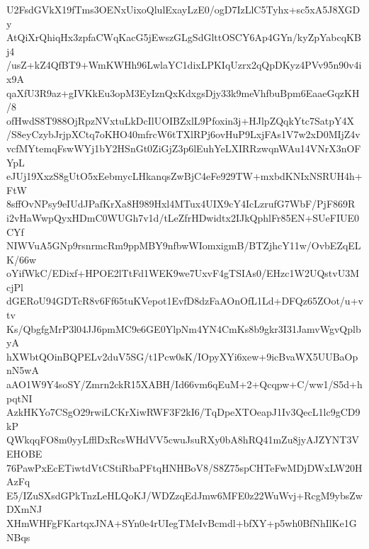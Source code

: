 U2FsdGVkX19fTms3OENxUixoQlulExayLzE0/ogD7IzLlC5Tyhx+sc5xA5J8XGDy
AtQiXrQhiqHx3zpfaCWqKacG5jEwszGLgSdGlttOSCY6Ap4GYn/kyZpYabcqKBj4
/usZ+kZ4QfBT9+WmKWHh96LwlaYC1dixLPKIqUzrx2qQpDKyz4PVv95n90v4ix9A
qaXfU3R9az+gIVKkEu3opM3EyIznQxKdxgsDjy33k9meVhfbuBpm6EaaeGqzKH/8
ofHwdS8T988OjRpzNVxtuLkDcIlUOIBZxlL9Pfoxin3j+HJlpZQqkYtc7SatpY4X
/S8eyCzybJrjpXCtq7oKHO40mfrcW6tTXlRPj6ovHuP9LxjFAs1V7w2xD0MIjZ4v
vcfMYtemqFswWYj1bY2HSnGt0ZiGjZ3p6lEuhYeLXIRRzwqnWAu14VNrX3nOFYpL
eJUj19XxzS8gUtO5xEebmycLHkanqsZwBjC4eFe929TW+mxbdKNIxNSRUH4h+FtW
8sffOvNPsy9eIUdJPafKrXa8H989Hxl4MTux4UIX9cY4IcLzrufG7WbF/PjF869R
i2vHaWwpQyxHDmC0WUGh7v1d/tLeZfrHDwidtx2IJkQphlFr85EN+SUeFIUE0CYf
NIWVuA5GNp9rsnrmcRm9ppMBY9nfbwWIomxigmB/BTZjhcY11w/OvbEZqELK/66w
oYifWkC/EDixf+HPOE2lTtFd1WEK9we7UxvF4gTSIAs0/EHzc1W2UQstvU3McjPl
dGERoU94GDTcR8v6Ff65tuKVepot1EvfD8dzFaAOnOfL1Ld+DFQz65ZOot/u+vtv
Ks/QbgfgMrP3l04JJ6pmMC9e6GE0YlpNm4YN4CmKs8b9gkr3I31JamvWgvQplbyA
hXWbtQOinBQPELv2duV5SG/t1Pcw0sK/IOpyXYi6xew+9icBvaWX5UUBaOpnN5wA
aAO1W9Y4soSY/Zmrn2ckR15XABH/Id66vm6qEuM+2+Qcqpw+C/ww1/S5d+hpqtNI
AzkHKYo7CSgO29rwiLCKrXiwRWF3F2kI6/TqDpeXTOeapJ1Iv3QecL1lc9gCD9kP
QWkqqFO8m0yyLfflDxRcsWHdVV5cwuJsuRXy0bA8hRQ41mZu8jyAJZYNT3VEHOBE
76PawPxEcETiwtdVtCStiRbaPFtqHNHBoV8/S8Z75spCHTeFwMDjDWxLW20HAzFq
E5/IZuSXsdGPkTnzLeHLQoKJ/WDZzqEdJmw6MFE0z22WuWvj+RcgM9ybsZwDXmNJ
XHmWHFgFKartqxJNA+SYn0e4rUIegTMeIvBcmdl+bfXY+p5wh0BfNhIlKe1GNBqs
